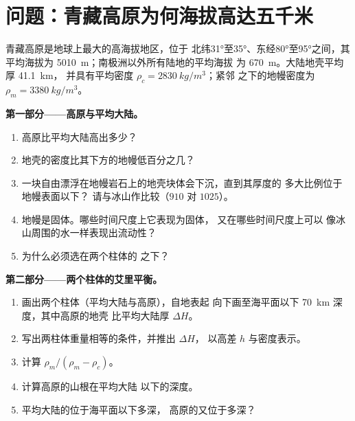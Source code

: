 \section{问题：青藏高原为何海拔高达五千米}

\begin{problem}
\label{pb:g11:lithosphere-asthenosphere:1}
青藏高原是地球上最大的高海拔地区，位于
北纬\ang{31}至\ang{35}、东经\ang{80}至\ang{95}之间，其
平均海拔为 \qty{5010}{m}；南极洲以外所有陆地的平均海拔
为 \qty{670}{m}。大陆地壳平均厚 \qty{41.1}{km}，
并具有平均密度 $\rho_c = \qty{2830}{kg/m^3}$；紧邻
之下的地幔密度为 $\rho_m = \qty{3380}{kg/m^3}$。

\medskip
\noindent\textbf{第一部分——高原与平均大陆。}
\begin{enumerate}
  \item 高原比平均大陆高出多少？
  \item 地壳的密度比其下方的地幔低百分之几？
  \item 一块自由漂浮在地幔岩石上的地壳块体会下沉，直到其厚度的
        多大比例位于地幔表面以下？
        请与冰山作比较（$910$ 对 $1025$）。
  \item 地幔是固体。哪些时间尺度上它表现为固体，
        又在哪些时间尺度上可以
        像冰山周围的水一样表现出流动性？
  \item 为什么必须选在两个柱体的
        之下？
\end{enumerate}

\medskip
\noindent\textbf{第二部分——两个柱体的艾里平衡。}
\begin{enumerate}[resume]
  \item 画出两个柱体（平均大陆与高原），自地表起
        向下画至海平面以下 \qty{70}{km} 深度，其中高原的地壳
        比平均大陆厚 $\Delta H$。
  \item 写出两柱体重量相等的条件，并推出 $\Delta H$，
        以高差 $h$ 与密度表示。
  \item 计算 $\rho_m/(\rho_m - \rho_c)$。
  \item 计算高原的山根在平均大陆
        以下的深度。
  \item 平均大陆的位于海平面以下多深，
        高原的又位于多深？
\end{enumerate}


\end{problem}
